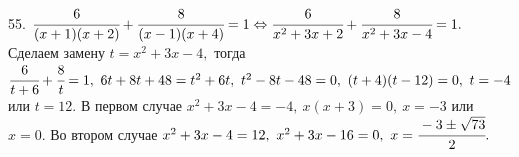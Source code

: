 55. $\cfrac{6}{(x+1)(x+2)}+\cfrac{8}{(x-1)(x+4)}=1\Leftrightarrow \cfrac{6}{x^2+3x+2}+\cfrac{8}{x^2+3x-4}=1.$ Сделаем замену $t=x^2+3x-4,$ тогда $\cfrac{6}{t+6}+\cfrac{8}{t}=1,\ 6t+8t+48=t^2+6t,\ t^2-8t-48=0,\ (t+4)(t-12)=0,\ t=-4$ или $t=12.$ В первом случае $x^2+3x-4=-4,\ x(x+3)=0,\ x=-3$ или $x=0.$ Во втором случае $x^2+3x-4=12,\ x^2+3x-16=0,\ x=\cfrac{-3\pm\sqrt{73}}{2}.$\\
